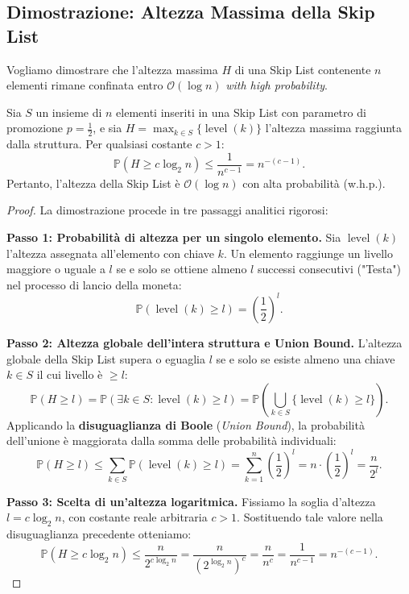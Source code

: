 \subsection{Dimostrazione: Altezza Massima della Skip List}
Vogliamo dimostrare che l'altezza massima $H$ di una Skip List contenente $n$ elementi rimane confinata entro $\mathcal{O}(\log n)$ \textit{with high probability}.

\begin{theorem}
Sia $S$ un insieme di $n$ elementi inseriti in una Skip List con parametro di promozione $p = \frac{1}{2}$, e sia $H = \max_{k \in S} \{\operatorname{level}(k)\}$ l'altezza massima raggiunta dalla struttura. Per qualsiasi costante $c > 1$:
\begin{equation}
  \mathbb{P}(H \ge c \log_2 n) \le \frac{1}{n^{c-1}} = n^{-(c-1)}.
\end{equation}
Pertanto, l'altezza della Skip List è $\mathcal{O}(\log n)$ con alta probabilità (w.h.p.).
\end{theorem}

\begin{proof}
La dimostrazione procede in tre passaggi analitici rigorosi:

\textbf{Passo 1: Probabilità di altezza per un singolo elemento.}
Sia $\operatorname{level}(k)$ l'altezza assegnata all'elemento con chiave $k$. Un elemento raggiunge un livello maggiore o uguale a $l$ se e solo se ottiene almeno $l$ successi consecutivi ("Testa") nel processo di lancio della moneta:
\begin{equation}
  \mathbb{P}(\operatorname{level}(k) \ge l) = \left(\frac{1}{2}\right)^l.
\end{equation}

\textbf{Passo 2: Altezza globale dell'intera struttura e Union Bound.}
L'altezza globale della Skip List supera o eguaglia $l$ se e solo se esiste almeno una chiave $k \in S$ il cui livello è $\ge l$:
\begin{equation}
  \mathbb{P}(H \ge l) = \mathbb{P}\left(\exists k \in S : \operatorname{level}(k) \ge l\right) = \mathbb{P}\left(\bigcup_{k \in S} \{\operatorname{level}(k) \ge l\}\right).
\end{equation}
Applicando la \textbf{disuguaglianza di Boole} (\textit{Union Bound}), la probabilità dell'unione è maggiorata dalla somma delle probabilità individuali:
\begin{equation}
  \mathbb{P}(H \ge l) \le \sum_{k \in S} \mathbb{P}(\operatorname{level}(k) \ge l) = \sum_{k=1}^n \left(\frac{1}{2}\right)^l = n \cdot \left(\frac{1}{2}\right)^l = \frac{n}{2^l}.
\end{equation}

\textbf{Passo 3: Scelta di un'altezza logaritmica.}
Fissiamo la soglia d'altezza $l = c \log_2 n$, con costante reale arbitraria $c > 1$. Sostituendo tale valore nella disuguaglianza precedente otteniamo:
\begin{equation}
  \mathbb{P}(H \ge c \log_2 n) \le \frac{n}{2^{c \log_2 n}} = \frac{n}{\left(2^{\log_2 n}\right)^c} = \frac{n}{n^c} = \frac{1}{n^{c-1}} = n^{-(c-1)}.
\end{equation}
\end{proof}

